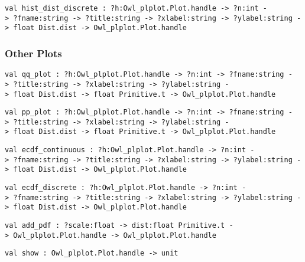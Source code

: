 \protect\hyperlink{val-histux5fdistux5fdiscrete}{}\texttt{val\ hist\_dist\_discrete\ :\ ?⁠h:Owl\_plplot.Plot.handle\ -\textgreater{}\ ?⁠n:int\ -\textgreater{}\ ?⁠fname:string\ -\textgreater{}\ ?⁠title:string\ -\textgreater{}\ ?⁠xlabel:string\ -\textgreater{}\ ?⁠ylabel:string\ -\textgreater{}\ float\ Dist.dist\ -\textgreater{}\ Owl\_plplot.Plot.handle}

\hypertarget{otherux5fplots}{\subsubsection{\texorpdfstring{\protect\hyperlink{otherux5fplots}{}Other
Plots}{Other Plots}}\label{otherux5fplots}}

\protect\hyperlink{val-qqux5fplot}{}\texttt{val\ qq\_plot\ :\ ?⁠h:Owl\_plplot.Plot.handle\ -\textgreater{}\ ?⁠n:int\ -\textgreater{}\ ?⁠fname:string\ -\textgreater{}\ ?⁠title:string\ -\textgreater{}\ ?⁠xlabel:string\ -\textgreater{}\ ?⁠ylabel:string\ -\textgreater{}\ float\ Dist.dist\ -\textgreater{}\ float\ Primitive.t\ -\textgreater{}\ Owl\_plplot.Plot.handle}

\protect\hyperlink{val-ppux5fplot}{}\texttt{val\ pp\_plot\ :\ ?⁠h:Owl\_plplot.Plot.handle\ -\textgreater{}\ ?⁠n:int\ -\textgreater{}\ ?⁠fname:string\ -\textgreater{}\ ?⁠title:string\ -\textgreater{}\ ?⁠xlabel:string\ -\textgreater{}\ ?⁠ylabel:string\ -\textgreater{}\ float\ Dist.dist\ -\textgreater{}\ float\ Primitive.t\ -\textgreater{}\ Owl\_plplot.Plot.handle}

\protect\hyperlink{val-ecdfux5fcontinuous}{}\texttt{val\ ecdf\_continuous\ :\ ?⁠h:Owl\_plplot.Plot.handle\ -\textgreater{}\ ?⁠n:int\ -\textgreater{}\ ?⁠fname:string\ -\textgreater{}\ ?⁠title:string\ -\textgreater{}\ ?⁠xlabel:string\ -\textgreater{}\ ?⁠ylabel:string\ -\textgreater{}\ float\ Dist.dist\ -\textgreater{}\ Owl\_plplot.Plot.handle}

\protect\hyperlink{val-ecdfux5fdiscrete}{}\texttt{val\ ecdf\_discrete\ :\ ?⁠h:Owl\_plplot.Plot.handle\ -\textgreater{}\ ?⁠n:int\ -\textgreater{}\ ?⁠fname:string\ -\textgreater{}\ ?⁠title:string\ -\textgreater{}\ ?⁠xlabel:string\ -\textgreater{}\ ?⁠ylabel:string\ -\textgreater{}\ float\ Dist.dist\ -\textgreater{}\ Owl\_plplot.Plot.handle}

\protect\hyperlink{val-addux5fpdf}{}\texttt{val\ add\_pdf\ :\ ?⁠scale:float\ -\textgreater{}\ dist:float\ Primitive.t\ -\textgreater{}\ Owl\_plplot.Plot.handle\ -\textgreater{}\ Owl\_plplot.Plot.handle}

\protect\hyperlink{val-show}{}\texttt{val\ show\ :\ Owl\_plplot.Plot.handle\ -\textgreater{}\ unit}

